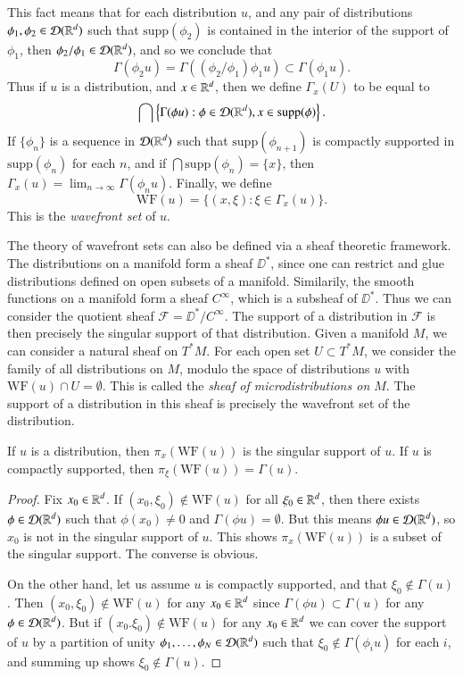This fact means that for each distribution $u$, and any pair of distributions $\phi_1,\phi_2 \in \operatorname{\mathcal{D}}(\operatorname{\mathbb{R}}^d)$ such that $\text{supp}(\phi_2)$ is contained in the interior of the support of $\phi_1$, then $\phi_2/\phi_1 \in \operatorname{\mathcal{D}}(\operatorname{\mathbb{R}}^d)$, and so we conclude that
%
\[ \Gamma(\phi_2 u) = \Gamma((\phi_2/\phi_1) \phi_1 u) \subset \Gamma(\phi_1 u). \]
%
Thus if $u$ is a distribution, and $x \in \operatorname{\mathbb{R}}^d$, then we define $\Gamma_x(U)$ to be equal to
%
\[ \bigcap \left\{ \Gamma(\phi u) : \phi \in \operatorname{\mathcal{D}}(\operatorname{\mathbb{R}}^d), x \in \text{supp}(\phi) \right\}. \]
%
If $\{ \phi_n \}$ is a sequence in $\operatorname{\mathcal{D}}(\operatorname{\mathbb{R}}^d)$ such that $\text{supp}(\phi_{n+1})$ is compactly supported in $\text{supp}(\phi_n)$ for each $n$, and if $\bigcap \text{supp}(\phi_n) = \{ x \}$, then $\Gamma_x(u) = \lim_{n \to \infty} \Gamma(\phi_n u)$. Finally, we define
%
\[ \text{WF}(u) = \{ (x,\xi): \xi \in \Gamma_x(u) \}. \]
%
This is the \emph{wavefront set} of $u$.

\begin{remark}
    The theory of wavefront sets can also be defined via a sheaf theoretic framework. The distributions on a manifold form a sheaf $\DD^*$, since one can restrict and glue distributions defined on open subsets of a manifold. Similarily, the smooth functions on a manifold form a sheaf $C^\infty$, which is a subsheaf of $\DD^*$. Thus we can consider the quotient sheaf $\mathcal{F} = \DD^* / C^\infty$. The support of a distribution in $\mathcal{F}$ is then precisely the singular support of that distribution. Given a manifold $M$, we can consider a natural sheaf on $T^*M$. For each open set $U \subset T^* M$, we consider the family of all distributions on $M$, modulo the space of distributions $u$ with $\text{WF}(u) \cap U = \emptyset$. This is called the \emph{sheaf of microdistributions on $M$}. The support of a distribution in this sheaf is precisely the wavefront set of the distribution.
\end{remark}

\begin{lemma}
    If $u$ is a distribution, then $\pi_x(\text{WF}(u))$ is the singular support of $u$. If $u$ is compactly supported, then $\pi_\xi(\text{WF}(u)) = \Gamma(u)$.
\end{lemma}
\begin{proof}
    Fix $x_0 \in \operatorname{\mathbb{R}}^d$. If $(x_0,\xi_0) \not \in \text{WF}(u)$ for all $\xi_0 \in \operatorname{\mathbb{R}}^d$, then there exists $\phi \in \operatorname{\mathcal{D}}(\operatorname{\mathbb{R}}^d)$ such that $\phi(x_0) \neq 0$ and $\Gamma(\phi u) = \emptyset$. But this means $\phi u \in \operatorname{\mathcal{D}}(\operatorname{\mathbb{R}}^d)$, so $x_0$ is not in the singular support of $u$. This shows $\pi_x(\text{WF}(u))$ is a subset of the singular support. The converse is obvious.

    On the other hand, let us assume $u$ is compactly supported, and that $\xi_0 \not \in \Gamma(u)$. Then $(x_0,\xi_0) \not \in \text{WF}(u)$ for any $x_0 \in \operatorname{\mathbb{R}}^d$ since $\Gamma(\phi u) \subset \Gamma(u)$ for any $\phi \in \operatorname{\mathcal{D}}(\operatorname{\mathbb{R}}^d)$. But if $(x_0.\xi_0) \not \in \text{WF}(u)$ for any $x_0 \in \operatorname{\mathbb{R}}^d$ we can cover the support of $u$ by a partition of unity $\phi_1,\dots,\phi_N \in \operatorname{\mathcal{D}}(\operatorname{\mathbb{R}}^d)$ such that $\xi_0 \not \in \Gamma(\phi_i u)$ for each $i$, and summing up shows $\xi_0 \not \in \Gamma(u)$.
\end{proof}

